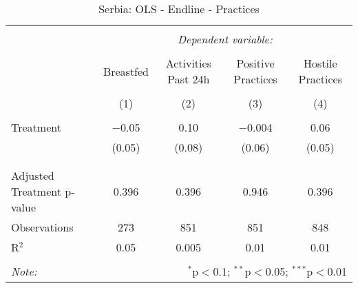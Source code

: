 
\begin{table}[!htbp] \centering 
  \caption{Serbia: OLS - Endline - Practices} 
  \label{tbl:Serbia: OLS - Endline - Practices} 
\begin{tabular}{@{\extracolsep{5pt}}lcccc} 
\\[-1.8ex]\hline 
\hline \\[-1.8ex] 
 & \multicolumn{4}{c}{\textit{Dependent variable:}} \\ 
\cline{2-5} 
\\[-1.8ex] & Breastfed & Activities Past 24h & Positive Practices & Hostile Practices \\ 
\\[-1.8ex] & (1) & (2) & (3) & (4)\\ 
\hline \\[-1.8ex] 
 Treatment & $-$0.05 & 0.10 & $-$0.004 & 0.06 \\ 
  & (0.05) & (0.08) & (0.06) & (0.05) \\ 
  & & & & \\ 
\hline \\[-1.8ex] 
Adjusted Treatment p-value & 0.396 & 0.396 & 0.946 & 0.396 \\ 
Observations & 273 & 851 & 851 & 848 \\ 
R$^{2}$ & 0.05 & 0.005 & 0.01 & 0.01 \\ 
\hline 
\hline \\[-1.8ex] 
\textit{Note:}  & \multicolumn{4}{r}{$^{*}$p$<$0.1; $^{**}$p$<$0.05; $^{***}$p$<$0.01} \\ 
\end{tabular} 
\end{table} 
